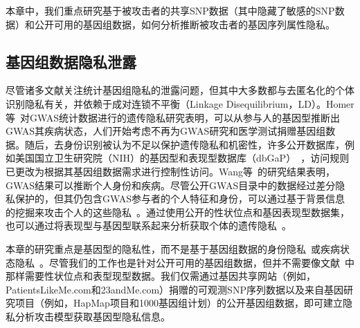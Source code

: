 本章中，我们重点研究基于被攻击者的共享SNP数据（其中隐藏了敏感的SNP数据）和公开可用的基因组数据，如何分析推断被攻击者的基因序列属性隐私。

\subsection{基因组数据隐私泄露}

尽管诸多文献关注统计基因组隐私的泄露问题，但其中大多数都与去匿名化的个体识别隐私有关，并依赖于成对连锁不平衡（Linkage Disequilibrium，LD）。Homer等~\cite{homer2008resolving}对GWAS统计数据进行的遗传隐私研究表明，可以从参与人的基因型推断出GWAS其疾病状态，人们开始考虑不再为GWAS研究和医学测试捐赠基因组数据。随后，去身份识别被认为不足以保护遗传隐私和机密性，许多公开数据库，例如美国国立卫生研究院（NIH）的基因型和表现型数据库（dbGaP）~\cite{mailman2007ncbi,nhgri2015privacy}，访问规则已更改为根据其基因组数据需求进行控制性访问。Wang等~\cite{wang2009learning}的研究结果表明，GWAS结果可以推断个人身份和疾病。尽管公开GWAS目录中的数据经过差分隐私保护的，但其仍包含GWAS参与者的个人特征和身份，可以通过基于背景信息的挖掘来攻击个人的这些隐私~\cite{wang2016infringement}。通过使用公开的性状位点和基因表现型数据集，也可以通过将表现型与基因型联系起来分析获取个体的遗传隐私~\cite{harmanci2016quantification}。

本章的研究重点是基因型的隐私性，而不是基于基因组数据的身份隐私~\cite{wang2009learning,wang2016infringement}或疾病状态隐私~\cite{homer2008resolving,wang2009learning}。尽管我们的工作也是针对公开可用的基因组数据，但并不需要像文献~\cite{wang2009learning,wang2016infringement,harmanci2016quantification}中那样需要性状位点和表型现型数据。我们仅需通过基因共享网站（例如，PatientsLikeMe.com和23andMe.com）捐赠的可观测SNP序列数据以及来自基因研究项目（例如，HapMap项目和1000基因组计划）的公开基因组数据，即可建立隐私分析攻击模型获取基因型隐私信息。

